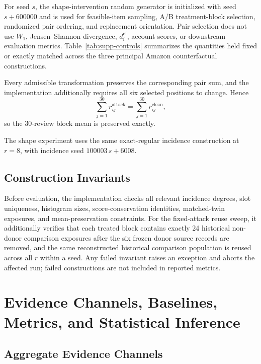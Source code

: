 For seed $s$, the shape-intervention random generator is initialized with seed
$s+600000$ and is used for feasible-item sampling, A/B treatment-block
selection, randomized pair ordering, and replacement orientation. Pair
selection does not use $W_1$, Jensen--Shannon divergence,
$d_i^{\mathrm{cf}}$, account scores, or downstream evaluation metrics. Table~\ref{tab:supp-controls} summarizes the quantities held fixed or exactly
matched across the three principal Amazon counterfactual constructions.

Every admissible transformation preserves the corresponding pair sum, and
the implementation additionally requires all six selected positions to
change. Hence
\[
\sum_{j=1}^{30}r_{ij}^{\mathrm{attack}}
=
\sum_{j=1}^{30}r_{ij}^{\mathrm{clean}},
\]
so the 30-review block mean is preserved exactly.

The shape experiment uses the same exact-regular incidence construction at
$r=8$, with incidence seed $100003\,s+6008$.


\subsection{Construction Invariants}
\label{sec:supp-construction-invariants}


Before evaluation, the implementation checks all relevant incidence degrees,
slot uniqueness, histogram sizes, score-conservation identities,
matched-twin exposures, and mean-preservation constraints. For the
fixed-attack reuse sweep, it additionally verifies that each treated block
contains exactly 24 historical non-donor comparison exposures after the six
frozen donor source records are removed, and the same reconstructed
historical comparison population is reused across all $r$ within a seed.
Any failed invariant raises an exception and aborts the affected run; failed
constructions are not included in reported metrics.
\section{Evidence Channels, Baselines, Metrics, and Statistical Inference}
\label{sec:supp-evaluation}

\subsection{Aggregate Evidence Channels}
\label{sec:supp-evidence-channels}

